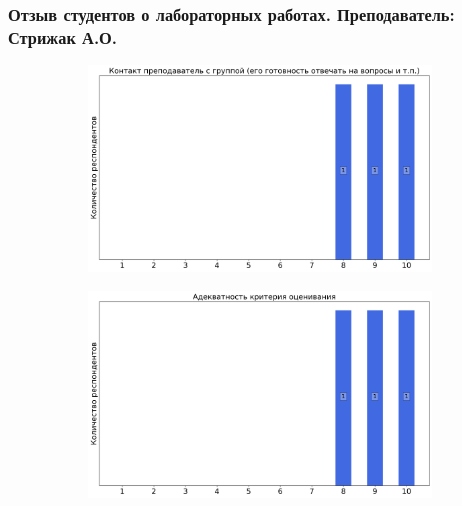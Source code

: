 	\subsubsection{Отзыв студентов о лабораторных работах. Преподаватель: Стрижак А.О.}
		\begin{figure}[H]
			\centering
			\begin{subfigure}[b]{0.45\textwidth}
				\centering
				\includegraphics[width=\textwidth]{images/2 course/Общая физика - электричество и магнетизм/labniks-marks-Стрижак А.О.-0.png}
			\end{subfigure}
			\begin{subfigure}[b]{0.45\textwidth}
				\centering
				\includegraphics[width=\textwidth]{images/2 course/Общая физика - электричество и магнетизм/labniks-marks-Стрижак А.О.-1.png}
			\end{subfigure}
			\begin{subfigure}[b]{0.45\textwidth}
				\centering

\end{subfigure}
\end{figure}
